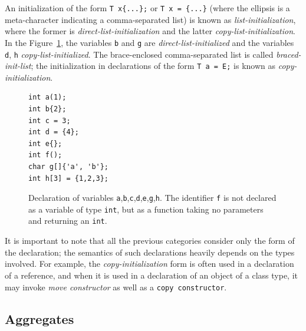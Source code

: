\documentclass[nolot,nolof,nocover,printed]{fithesis3}
\begin{document}
An initialization of the form \lstinline|T x{...};| or \lstinline|T x = {...}| (where the ellipsis is a meta-character indicating a comma-separated list) is known as \textit{list-initialization}, where the former is \textit{direct-list-initialization} and the latter \textit{copy-list-initialization}. In the Figure~\ref{fig:initializers}, the variables \texttt{b} and \texttt{g} are \textit{direct-list-initialized} and the variables \texttt{d}, \texttt{h} \textit{copy-list-initialized}. The brace-enclosed comma-separated list is called \textit{braced-init-list}; the initialization in declarations of the form \lstinline|T a = E;| is known as \textit{copy-initialization}.

\begin{figure}[ht]
\begin{lstlisting}
int a(1);
int b{2};
int c = 3;
int d = {4};
int e{};
int f();
char g[]{'a', 'b'};
int h[3] = {1,2,3};
\end{lstlisting}
\caption[Declarations and initializers]{Declaration of variables \texttt{a},\texttt{b},\texttt{c},\texttt{d},\texttt{e},\texttt{g},\texttt{h}. The identifier \texttt{f} is not declared as a variable of type \texttt{int}, but as a function taking no parameters and returning an \texttt{int}.}
\label{fig:initializers}
\end{figure}

It is important to note that all the previous categories consider only the form of the declaration; the semantics of such declarations heavily depends on the types involved. For example, the \textit{copy-initialization} form is often used in a declaration of a reference, and when it is used in a declaration of an object of a class type, it may invoke \textit{move constructor} as well as a \texttt{copy constructor}.



\subsection{Aggregates}
\end{document}
